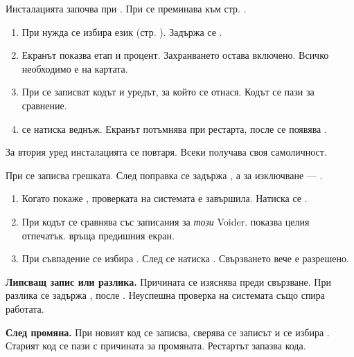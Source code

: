 Инсталацията започва при . При  се преминава към стр. \pageref{bg:check}.
\begin{enumerate}
\item При нужда се избира език (стр. \pageref{bg:controls}). Задържа се .
\item Екранът показва етап и процент. Захранването остава включено. Всичко необходимо е на картата.
\item При  се записват кодът и уредът, за който се отнася. Кодът се пази за сравнение.
\item {} се натиска веднъж. Екранът потъмнява при рестарта, после се появява .
\end{enumerate}
За втория уред инсталацията се повтаря. Всеки получава своя самоличност.

При  се записва грешката. След поправка се задържа , а за изключване --- .

\begin{enumerate}
\item Когато  покаже , проверката на системата е завършила. Натиска се .
\item При  кодът се сравнява със записания за \emph{този} Voider.  показва целия отпечатък.  връща предишния екран.
\item При съвпадение се избира . След  се натиска . Свързването вече е разрешено.
\end{enumerate}
\textbf{Липсващ запис или разлика.} Причината се изяснява преди свързване. При разлика се задържа , после . Неуспешна проверка на системата също спира работата.

\textbf{След промяна.} При  новият код се записва, сверява се записът и се избира . Старият код се пази с причината за промяната. Рестартът запазва кода.

